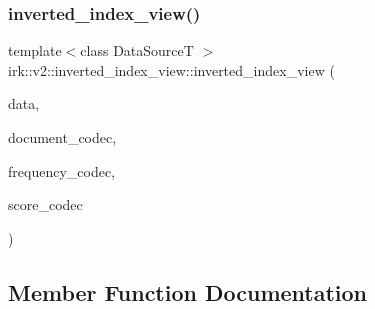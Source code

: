 \mbox{\label{classirk_1_1v2_1_1inverted__index__view_a1aab95c206287bbec6b7c2ab34ffbf92}} 
\subsubsection{\texorpdfstring{inverted\+\_\+index\+\_\+view()}{inverted\_index\_view()}\hspace{0.1cm}{\footnotesize\ttfamily [4/4]}}
{\footnotesize\ttfamily template$<$class Data\+SourceT $>$ \\
irk\+::v2\+::inverted\+\_\+index\+\_\+view\+::inverted\+\_\+index\+\_\+view (\begin{DoxyParamCaption}\item[{Data\+SourceT $\ast$}]{data,  }\item[{\mbox{\hyperlink{namespaceirk_a831a3a869cf19601dbfb5c41765a2e87}{any\+\_\+codec}}$<$ \mbox{\hyperlink{classirk_1_1v2_1_1inverted__index__view_a8441dcf60be934782fdaa9411723700b}{document\+\_\+type}} $>$}]{document\+\_\+codec,  }\item[{\mbox{\hyperlink{namespaceirk_a831a3a869cf19601dbfb5c41765a2e87}{any\+\_\+codec}}$<$ \mbox{\hyperlink{classirk_1_1v2_1_1inverted__index__view_ab52405d4c17e6e82893d2650a56e0a32}{frequency\+\_\+type}} $>$}]{frequency\+\_\+codec,  }\item[{\mbox{\hyperlink{namespaceirk_a831a3a869cf19601dbfb5c41765a2e87}{any\+\_\+codec}}$<$ \mbox{\hyperlink{classirk_1_1v2_1_1inverted__index__view_a5a1f88560e9fe17b54c7af6e2aa31639}{score\+\_\+type}} $>$}]{score\+\_\+codec }\end{DoxyParamCaption})\hspace{0.3cm}{\ttfamily [inline]}}



\subsection{Member Function Documentation}
\mbox{\label{classirk_1_1v2_1_1inverted__index__view_a6397e7c10fc74ba36d76491286e98a15}} 
